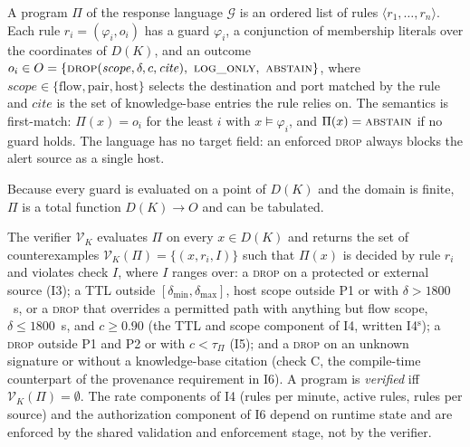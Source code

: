 \documentclass[final,5p]{elsarticle}
\begin{document}
\begin{definition}\label{def:language}
A program $\Pi$ of the response language $\mathcal{G}$ is an ordered list of rules $\langle r_1,\ldots,r_n\rangle$. Each rule $r_i=(\varphi_i,o_i)$ has a guard $\varphi_i$, a conjunction of membership literals over the coordinates of $D(K)$, and an outcome $o_i\in O=\{\textsc{drop}(\mathit{scope},\delta,c,\mathit{cite}),\ \textsc{log\_only},\ \textsc{abstain}\}$, where $\mathit{scope}\in\{\text{flow},\text{pair},\text{host}\}$ selects the destination and port matched by the rule and $\mathit{cite}$ is the set of knowledge-base entries the rule relies on. The semantics is first-match: $\Pi(x)=o_i$ for the least $i$ with $x\models\varphi_i$, and $\Pi(x)=\textsc{abstain}$ if no guard holds. The language has no target field: an enforced \textsc{drop} always blocks the alert source as a single host.
\end{definition}

Because every guard is evaluated on a point of $D(K)$ and the domain is finite, $\Pi$ is a total function $D(K)\to O$ and can be tabulated.

\begin{definition}[Verifier]\label{def:verifier}
The verifier $\mathcal{V}_K$ evaluates $\Pi$ on every $x\in D(K)$ and returns the set of counterexamples $\mathcal{V}_K(\Pi)=\{(x,r_i,I)\}$ such that $\Pi(x)$ is decided by rule $r_i$ and violates check $I$, where $I$ ranges over: a \textsc{drop} on a protected or external source (I3); a TTL outside $[\delta_{\min},\delta_{\max}]$, host scope outside P1 or with $\delta>1800$~s, or a \textsc{drop} that overrides a permitted path with anything but flow scope, $\delta\le 1800$~s, and $c\ge 0.90$ (the TTL and scope component of I4, written I4$^{\mathrm{s}}$); a \textsc{drop} outside P1 and P2 or with $c<\tau_\Pi$ (I5); and a \textsc{drop} on an unknown signature or without a knowledge-base citation (check C, the compile-time counterpart of the provenance requirement in I6). A program is \emph{verified} iff $\mathcal{V}_K(\Pi)=\emptyset$. The rate components of I4 (rules per minute, active rules, rules per source) and the authorization component of I6 depend on runtime state and are enforced by the shared validation and enforcement stage, not by the verifier.
\end{definition}
\end{document}
